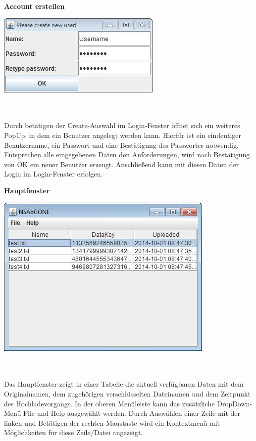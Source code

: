\documentclass[12pt,a4paper,bibliography=totocnumbered,listof=totocnumbered]{scrartcl}
\begin{document}
\textbf{Account erstellen}
\vspace{1em}
$\;$\\
\begin{minipage}{\linewidth}
	\centering
	\includegraphics[width=0.4\linewidth]{Create.jpg}
	\label{Create}
\end{minipage}
\\\\Durch betätigen der Create-Auswahl im Login-Fenster öffnet sich ein weiteres PopUp, in dem ein Benutzer angelegt werden kann. Hierfür ist ein eindeutiger Benutzername, ein Passwort und eine Bestätigung des Passwortes notwendig. Entsprechen alle eingegebenen Daten den Anforderungen, wird nach Bestätigung von OK ein neuer Benutzer erzeugt. Anschließend kann mit diesen Daten der Login im Login-Fenster erfolgen.

\textbf{Hauptfenster}
\vspace{1em}
$\;$\\
\begin{minipage}{\linewidth}
	\centering
	\includegraphics[width=0.4\linewidth]{Main.jpg}
	\label{Main}
\end{minipage}
\\\\Das Hauptfenster zeigt in einer Tabelle die aktuell verfügbaren Daten mit dem Originalnamen, dem zugehörigen verschlüsselten Dateinamen und dem Zeitpunkt des Hochladevorgangs. In der oberen Menüleiste kann das zusätzliche DropDown-Menü File und Help ausgewählt werden. Durch Auswählen einer Zeile mit der linken und Betätigen der rechten Maustaste wird ein Kontextmenü mit Möglichkeiten für diese Zeile/Datei angezeigt.
\end{document}
